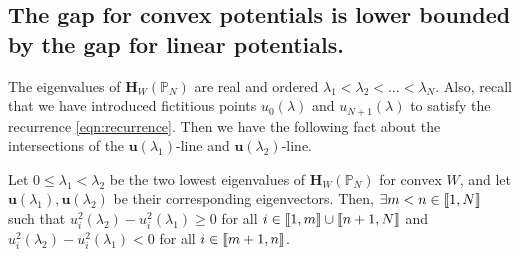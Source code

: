   \subsection{The gap for convex potentials is lower bounded by the gap for linear potentials.}
  The eigenvalues of $\mathbf{H}_W(\mathbb{P}_N)$ are real and ordered $\lambda_1 < \lambda_2 < \dots < \lambda_N$. Also, recall that we have introduced fictitious points $u_0(\lambda)$ and $u_{N+1}(\lambda)$ to satisfy the recurrence \cref{eqn:recurrence}. Then we have the following fact about the intersections of the $\mathbf{u}(\lambda_1)$-line and $\mathbf{u}(\lambda_2)$-line.
  \begin{lem}\label{lem:intersection}
    Let $0\leq\lambda_1<\lambda_2$ be the two lowest eigenvalues of $\mathbf{H}_{W}(\mathbb{P}_N)$ for convex $W$, and let $\mathbf{u}(\lambda_1),\mathbf{u}(\lambda_2)$ be their corresponding eigenvectors. Then, $\exists m<n \in \left \llbracket 1 , N \right \rrbracket$ such that $u_{i}^2(\lambda_2) - u_{i}^2(\lambda_1) \geq 0$ for all $i \in \left \llbracket 1 , m \right \rrbracket\cup\left \llbracket n+1 , N \right \rrbracket$ and $u_{i}^2(\lambda_2) - u_{i}^2(\lambda_1) < 0$ for all $i \in \left \llbracket m+1 , n \right \rrbracket$.
  \end{lem}

